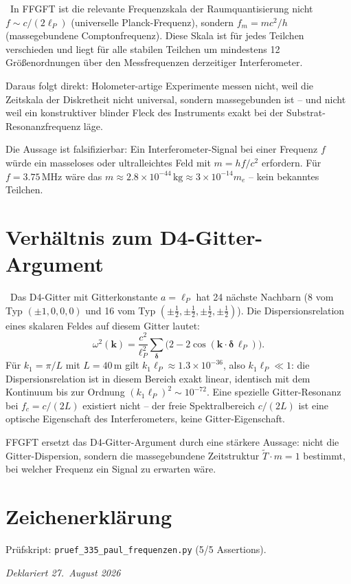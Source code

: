 \begin{kernbox}[title={Fazit: Warum Holometer-artige Experimente kein Signal finden}]
\KM\ In FFGFT ist die relevante Frequenzskala der Raumquantisierung nicht
$f \sim c/(2\ell_P)$ (universelle Planck-Frequenz), sondern
$f_m = mc^2/h$ (massegebundene Comptonfrequenz). Diese Skala ist für
jedes Teilchen verschieden und liegt für alle stabilen Teilchen um
mindestens 12 Größenordnungen über den Messfrequenzen derzeitiger
Interferometer.

Daraus folgt direkt: Holometer-artige Experimente messen nicht, weil
die Zeitskala der Diskretheit nicht universal, sondern massegebunden
ist -- und nicht weil ein konstruktiver blinder Fleck des Instruments
exakt bei der Substrat-Resonanzfrequenz läge.

Die Aussage ist falsifizierbar: Ein Interferometer-Signal bei einer
Frequenz $f$ würde ein masseloses oder ultralleichtes Feld mit
$m = hf/c^2$ erfordern. Für $f = 3.75\,\text{MHz}$ wäre das
$m \approx 2.8\times10^{-44}\,\text{kg} \approx 3\times10^{-14}m_e$ --
kein bekanntes Teilchen.
\end{kernbox}

\section{Verhältnis zum D4-Gitter-Argument}

\KM\ Das D4-Gitter mit Gitterkonstante $a=\ell_P$ hat 24 nächste Nachbarn
(8 vom Typ $(\pm1,0,0,0)$ und 16 vom Typ $(\pm\tfrac{1}{2},\pm\tfrac{1}{2},\pm\tfrac{1}{2},\pm\tfrac{1}{2})$).
Die Dispersionsrelation eines skalaren Feldes auf diesem Gitter lautet:
\begin{equation}
\omega^2(\mathbf{k}) = \frac{c^2}{\ell_P^2}\sum_{\symbf{\delta}} \bigl(2-2\cos(\mathbf{k}\cdot\symbf{\delta}\,\ell_P)\bigr).
\end{equation}
Für $k_1 = \pi/L$ mit $L=40\,\text{m}$ gilt $k_1\ell_P \approx 1.3\times10^{-36}$,
also $k_1\ell_P \ll 1$: die Dispersionsrelation ist in diesem Bereich exakt
linear, identisch mit dem Kontinuum bis zur Ordnung $(k_1\ell_P)^2\sim10^{-72}$.
Eine spezielle Gitter-Resonanz bei $f_c = c/(2L)$ existiert nicht -- der
freie Spektralbereich $c/(2L)$ ist eine optische Eigenschaft des
Interferometers, keine Gitter-Eigenschaft.

FFGFT ersetzt das D4-Gitter-Argument durch eine stärkere Aussage: nicht
die Gitter-Dispersion, sondern die massegebundene Zeitstruktur
$\tilde{T}\cdot m=1$ bestimmt, bei welcher Frequenz ein Signal zu
erwarten wäre.

\section*{Zeichenerklärung}



Prüfskript: \texttt{pruef\_335\_paul\_frequenzen.py} (5/5 Assertions).

\emph{Deklariert 27.~August 2026}
